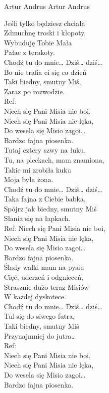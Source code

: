 {Artur Andrus}
{Artur Andrus}
\begin{text}
Jeśli tylko będziesz chciała\\
Zdmuchnę troski i kłopoty,\\
Wybuduję Tobie Mała\\
Pałac z terakoty.\\
Chodź tu do mnie… Dziś… dziś…\\
Bo nie trafia ci się co dzień\\
Taki biedny, smutny Miś,\\
Zaraz po rozwodzie.\\

Ref:\\
Niech się Pani Misia nie boi,\\
Niech się Pani Misia nie lęka,\\
Do wesela się Misio zagoi…\\
Bardzo fajna piosenka.\\

Tutaj cztery szwy na łuku,\\
Tu, na pleckach, mam znamiona,\\
Takie mi zrobiła kuku\\
Moja była żona.\\
Chodź tu do mnie… Dziś… dziś…\\
Taka fajna z Ciebie babka,\\
Spójrz jak biedny, smutny Miś\\
Słania się na łapkach.\\

Ref: Niech się Pani Misia nie boi,\\
Niech się Pani Misia nie lęka,\\
Do wesela się Misio zagoi…\\
Bardzo fajna piosenka.\\

Ślady walki mam na pysiu\\
Cięć, uderzeń i odgnieceń,\\
Strasznie dużo teraz Misiów\\
W każdej dyskotece.\\
Chodź tu do mnie… Dziś… dziś…\\
Tul się do siwego futra,\\
Taki biedny, smutny Miś\\
Przynajmniej do jutra…\\

Ref:\\
Niech się Pani Misia nie boi,\\
Niech się Pani Misia nie lęka,\\
Do wesela się Misio zagoi…\\
Bardzo fajna piosenka.\\
\end{text}
\begin{chord}
\end{chord}
